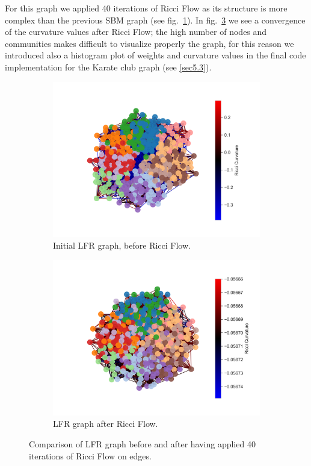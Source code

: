 For this graph we applied 40 iterations of Ricci Flow as its structure is more complex than the previous SBM graph (see fig.~\ref{fig:LFR_comparison_a}). In fig.~\ref{fig:LFR_comparison_b} we see a convergence of the curvature values after Ricci Flow; the high number of nodes and communities makes difficult to visualize properly the graph, for this reason we introduced also a histogram plot of weights and curvature values in the final code implementation for the Karate club graph (see \autoref{sec5.3}).
\begin{figure}
    \centering
    \begin{subfigure}{0.45\textwidth}
        \centering
        \includegraphics[width=\textwidth]{../tests/ToyModelResults/LFR/Before Ricci Flow.png}
        \caption{Initial LFR graph, before Ricci Flow.}
        \label{fig:LFR_comparison_a}
    \end{subfigure}
    \hfill
    \begin{subfigure}{0.45\textwidth}
        \centering
        \includegraphics[width=\textwidth]{../tests/ToyModelResults/LFR/After Ricci Flow.png}
        \caption{LFR graph after Ricci Flow.}
        \label{fig:LFR_comparison_b}
    \end{subfigure}
    \caption{Comparison of LFR graph before and after having applied 40 iterations of  Ricci Flow on edges.}
\end{figure}

